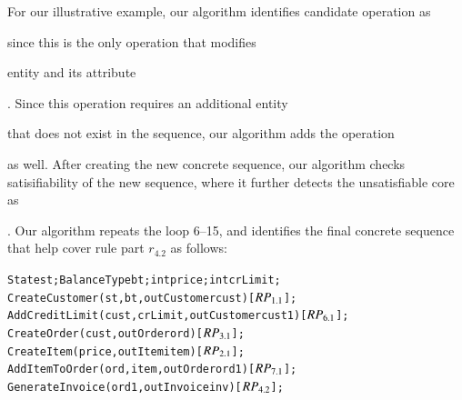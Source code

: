 For our illustrative example, our algorithm identifies candidate operation as \subject{AddItemToOrder}
since this is the only operation that modifies \subject{Order} entity and its attribute \subject{total}.
Since this operation requires an additional entity \subject{Item} that does not exist
in the sequence, our algorithm adds the operation \subject{CreateItem} as well. After creating
the new concrete sequence, our algorithm checks satisifiability of the new sequence,
where it further detects the unsatisfiable core as \subject{cust.crLimit = 0 $\wedge$ cust.crLimit > 0}. 
Our algorithm repeats the loop 6--15, and identifies the final concrete sequence that help cover rule part $r_{4.2}$ as
follows:

\vspace*{-5pt}
{\small
\begin{alltt}
  State st; BalanceType bt; int price; int crLimit;
  CreateCustomer(st, bt, out Customer cust) [\(RP\sb{1.1}\)];
  AddCreditLimit(cust, crLimit, out Customer cust1) [\(RP\sb{6.1}\)];
  CreateOrder(cust, out Order ord) [\(RP\sb{3.1}\)];
  CreateItem(price, out Item item) [\(RP\sb{2.1}\)];
  AddItemToOrder(ord, item, out Order ord1) [\(RP\sb{7.1}\)];
  GenerateInvoice(ord1, out Invoice inv) [\(RP\sb{4.2}\)];  
\end{alltt}
}
\vspace*{-5pt}

